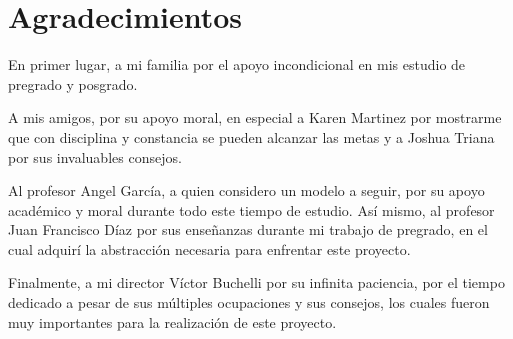 \section*{Agradecimientos}

En primer lugar, a mi familia por el apoyo incondicional en mis estudio de pregrado y posgrado.

A mis amigos, por su apoyo moral, en especial a Karen Martinez por mostrarme que con disciplina y constancia se pueden alcanzar las metas y a Joshua Triana por sus invaluables consejos.

Al profesor Angel García, a quien considero un modelo a seguir, por su apoyo académico y moral durante todo este tiempo de estudio. Así mismo, al profesor Juan Francisco Díaz por sus enseñanzas durante mi trabajo de pregrado, en el cual adquirí la abstracción necesaria para enfrentar este proyecto.

Finalmente, a mi director Víctor Buchelli por su infinita paciencia, por el tiempo dedicado a pesar de sus múltiples ocupaciones y sus consejos, los cuales fueron muy importantes para la realización de este proyecto.